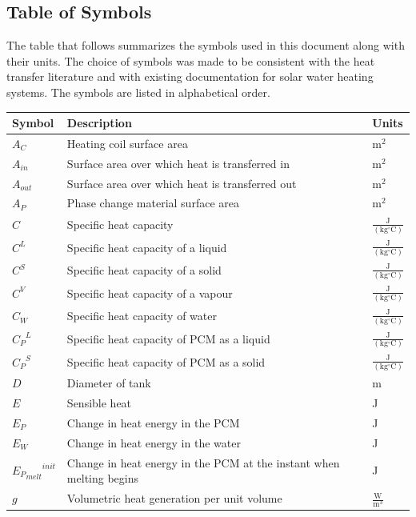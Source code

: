 \documentclass[12pt]{article}
\begin{document}
\subsection{Table of Symbols}
\label{Sec:ToS}
The table that follows summarizes the symbols used in this document along with their units. The choice of symbols was made to be consistent with the heat transfer literature and with existing documentation for solar water heating systems. The symbols are listed in alphabetical order.
\begin{longtabu}{l X[l] l}
\toprule
Symbol & Description & Units
\\
\midrule
\endhead
${A_{C}}$ & Heating coil surface area & $\text{m}^{2}$
\\
${A_{in}}$ & Surface area over which heat is transferred in & $\text{m}^{2}$
\\
${A_{out}}$ & Surface area over which heat is transferred out & $\text{m}^{2}$
\\
${A_{P}}$ & Phase change material surface area & $\text{m}^{2}$
\\
$C$ & Specific heat capacity & $\frac{\text{J}}{(\text{kg}{}^{\circ}\text{C})}$
\\
${C^{L}}$ & Specific heat capacity of a liquid & $\frac{\text{J}}{(\text{kg}{}^{\circ}\text{C})}$
\\
${C^{S}}$ & Specific heat capacity of a solid & $\frac{\text{J}}{(\text{kg}{}^{\circ}\text{C})}$
\\
${C^{V}}$ & Specific heat capacity of a vapour & $\frac{\text{J}}{(\text{kg}{}^{\circ}\text{C})}$
\\
${C_{W}}$ & Specific heat capacity of water & $\frac{\text{J}}{(\text{kg}{}^{\circ}\text{C})}$
\\
${{C_{P}}^{L}}$ & Specific heat capacity of PCM as a liquid & $\frac{\text{J}}{(\text{kg}{}^{\circ}\text{C})}$
\\
${{C_{P}}^{S}}$ & Specific heat capacity of PCM as a solid & $\frac{\text{J}}{(\text{kg}{}^{\circ}\text{C})}$
\\
$D$ & Diameter of tank & m
\\
$E$ & Sensible heat & J
\\
${E_{P}}$ & Change in heat energy in the PCM & J
\\
${E_{W}}$ & Change in heat energy in the water & J
\\
${{{E_{P}}_{melt}}^{init}}$ & Change in heat energy in the PCM at the instant when melting begins & J
\\
$g$ & Volumetric heat generation per unit volume & $\frac{\text{W}}{\text{m}^{3}}$

\end{longtabu}
\end{document}
